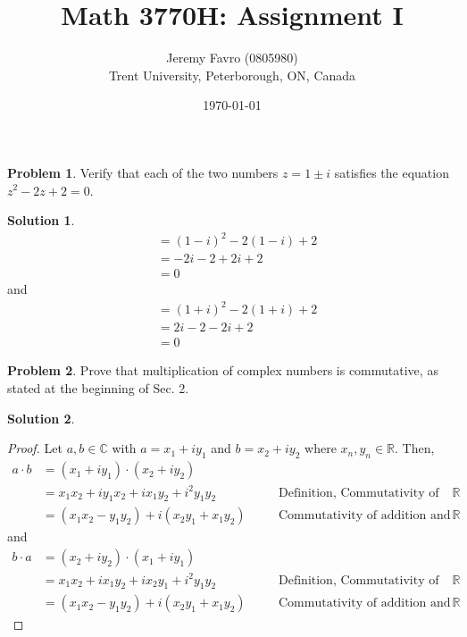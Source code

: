 \documentclass[10pt]{article}
\title{Math 3770H: Assignment I}
\author{Jeremy Favro (0805980) \\ Trent University, Peterborough, ON, Canada}
\date{\today}
\theoremstyle{definition}
\newtheorem{problem}{Problem}
\newtheorem{soln}{Solution}
\newcommand{\justif}[2]{&{#1}&\text{#2}}
\begin{document}
\maketitle

\begin{problem}
Verify that each of the two numbers $z = 1 \pm i$ satisfies the equation $z^2 - 2z + 2 = 0$.
\end{problem}
\begin{soln}
  \begin{align*}
     & =(1 - i)^2 - 2(1 - i) + 2 \\
     & =-2i - 2 + 2i + 2         \\
     & =0
  \end{align*}
  and
  \begin{align*}
     & =(1 + i)^2 - 2(1 + i) + 2 \\
     & =2i - 2 - 2i + 2          \\
     & =0
  \end{align*}
\end{soln}

\begin{problem}
Prove that multiplication of complex numbers is commutative, as stated at the beginning
of Sec. 2.
\end{problem}
\begin{soln}
  \begin{proof}
    Let $a,b\in \mathbb{C}$ with $a=x_1+ iy_1$ and $b=x_2+ iy_2$ where $x_n,y_n\in \mathbb{R}$. Then,
    \begin{align*}
      a\cdot b & = (x_1+ iy_1)\cdot(x_2+ iy_2)          \\
               & = x_1x_2+ iy_1x_2 + ix_1y_2+ i^2y_1y_2 \justif{\quad}{Definition, Commutativity of addition and multiplication under $\mathbb{R}$} \\
               & = (x_1x_2-y_1y_2)+ i(x_2y_1 + x_1y_2) \justif{\quad}{Commutativity of addition and multiplication under $\mathbb{R}$}
    \end{align*}
    and
    \begin{align*}
      b\cdot a & = (x_2+ iy_2)\cdot(x_1+ iy_1)         \\
               & = x_1x_2+ix_1y_2+ix_2y_1+i^2y_1y_2 \justif{\quad}{Definition, Commutativity of addition and multiplication under $\mathbb{R}$}   \\
               & = (x_1x_2-y_1y_2)+ i(x_2y_1 + x_1y_2) \justif{\quad}{Commutativity of addition and multiplication under $\mathbb{R}$}
    \end{align*}
  \end{proof}
\end{soln}
\newpage
\end{document}
